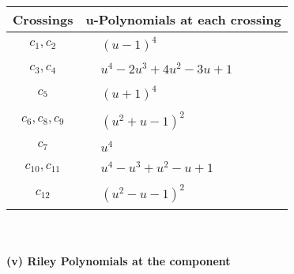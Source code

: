 \documentclass[1p]{elsarticle_modified}
\theoremstyle{definition}
\begin{document}
\begin{tabular}{m{50pt}|m{274pt}}
Crossings & \hspace{64pt}u-Polynomials at each crossing \\
\hline $$\begin{aligned}c_{1},c_{2}\end{aligned}$$&$\begin{aligned}
&(u-1)^4
\end{aligned}$\\
\hline $$\begin{aligned}c_{3},c_{4}\end{aligned}$$&$\begin{aligned}
&u^4-2 u^3+4 u^2-3 u+1
\end{aligned}$\\
\hline $$\begin{aligned}c_{5}\end{aligned}$$&$\begin{aligned}
&(u+1)^4
\end{aligned}$\\
\hline $$\begin{aligned}c_{6},c_{8},c_{9}\end{aligned}$$&$\begin{aligned}
&(u^2+u-1)^2
\end{aligned}$\\
\hline $$\begin{aligned}c_{7}\end{aligned}$$&$\begin{aligned}
&u^4
\end{aligned}$\\
\hline $$\begin{aligned}c_{10},c_{11}\end{aligned}$$&$\begin{aligned}
&u^4- u^3+u^2- u+1
\end{aligned}$\\
\hline $$\begin{aligned}c_{12}\end{aligned}$$&$\begin{aligned}
&(u^2- u-1)^2
\end{aligned}$\\
\hline
\end{tabular}\\~\\
\newpage\renewcommand{\arraystretch}{1}
\flushleft \textbf{(v) Riley Polynomials at the component}\newline \\
\end{document}
